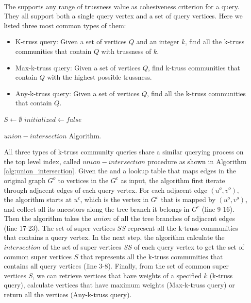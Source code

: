 ~\\The \twolevelindex{} supports any range of trussness value as cohesiveness criterion for a query. They all support both a single query vertex and a set of query vertices. Here we listed three most common types of them: 
\begin{itemize}
	\item{K-truss query:} Given a set of vertices $Q$ and an integer $k$, find all the k-truss communities that contain $Q$ with trussness of $k$.
	\item{Max-k-truss query:} Given a set of vertices $Q$, find k-truss communities that contain $Q$ with the highest possible trussness.
	\item{Any-k-truss query:} Given a set of vertices $Q$, find all the k-truss communities that contain $Q$.
\end{itemize}

\begin{algorithm}
	\BlankLine
	$S \gets \emptyset$\;
	$initialized \gets false$\;
	\BlankLine
	\BlankLine
	\caption{$union-intersection$ Algorithm.}\label{alg:union_intersection}
\end{algorithm}

All three types of \toplevelprob{} k-truss community queries share a similar querying process on the top level index, called $union-intersection$ procedure as shown in Algorithm \ref{alg:union_intersection}. Given the \twolevelindex{} and a lookup table that maps edges in the original graph $G^o$ to vertices in the \treeindex{} $G^c$ as input, the algorithm first iterate through adjacent edges of each query vertex. For each adjacent edge $(u^o, v^o)$, the algorithm starts at $u^c$, which is the vertex in $G^c$ that is mapped by $(u^o, v^o)$, and collect all its ancestors along the tree branch it belongs in $G^c$ (line 9-16). Then the algorithm takes the $union$ of all the tree branches of adjacent edges (line 17-23). The set of super vertices $SS$ represent all the k-truss communities that contains a query vertex. In the next step, the algorithm calculate the $intersection$ of the set of super vertices $SS$ of each query vertex to get the set of common super vertices $S$ that represents all the k-truss communities that contains all query vertices (line 3-8). Finally, from the set of common super vertices $S$, we can retrieve vertices that have weights of a specified $k$ (k-truss query), calculate vertices that have maximum weights (Max-k-truss query) or return all the vertices (Any-k-truss query).  

